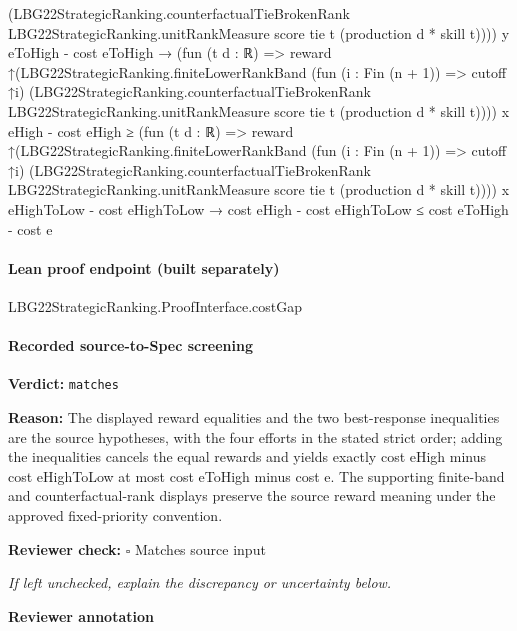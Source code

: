 \documentclass[10pt]{article}
\newcommand{\reviewerbox}{%
  \par\noindent\fbox{\parbox{0.96\linewidth}{\rule{0pt}{0.38in}}}\par
}
\newcommand{\reviewmatch}[1]{%
  \par\noindent\textbf{Reviewer check:} $\square$\; #1\par
  \noindent\emph{If left unchecked, explain the discrepancy or uncertainty below.}\par
}
\begin{document}
\begin{ReviewVerbatim}
                    (LBG22StrategicRanking.counterfactualTieBrokenRank LBG22StrategicRanking.unitRankMeasure score tie t
                      (production d * skill t))))
            y eToHigh -
          cost eToHigh →
      (fun (t d : ℝ) =>
                reward
                  ↑(LBG22StrategicRanking.finiteLowerRankBand (fun (i : Fin (n + 1)) => cutoff ↑i)
                      (LBG22StrategicRanking.counterfactualTieBrokenRank LBG22StrategicRanking.unitRankMeasure score tie
                        t (production d * skill t))))
              x eHigh -
            cost eHigh ≥
          (fun (t d : ℝ) =>
                reward
                  ↑(LBG22StrategicRanking.finiteLowerRankBand (fun (i : Fin (n + 1)) => cutoff ↑i)
                      (LBG22StrategicRanking.counterfactualTieBrokenRank LBG22StrategicRanking.unitRankMeasure score tie
                        t (production d * skill t))))
              x eHighToLow -
            cost eHighToLow →
        cost eHigh - cost eHighToLow ≤ cost eToHigh - cost e
\end{ReviewVerbatim}

\paragraph{Lean proof endpoint (built separately)}\begin{ReviewVerbatim}
LBG22StrategicRanking.ProofInterface.costGap
\end{ReviewVerbatim}

\paragraph{Recorded source-to-Spec screening}
\textbf{Verdict:} \texttt{matches}
\\
{\raggedright
\textbf{Reason:} The displayed reward equalities and the two best-\allowbreak{}response inequalities are the source hypotheses, with the four efforts in the stated strict order;\allowbreak{} adding the inequalities cancels the equal rewards and yields exactly cost eHigh minus cost eHighToLow at most cost eToHigh minus cost e.\allowbreak{} The supporting finite-\allowbreak{}band and counterfactual-\allowbreak{}rank displays preserve the source reward meaning under the approved fixed-\allowbreak{}priority convention.\allowbreak{}
\par}
\reviewmatch{Matches source input}
\noindent\textbf{Reviewer annotation}\par
\reviewerbox
\clearpage
\hypertarget{source-claim-e24c6aaefba531d0}{}
\end{document}
